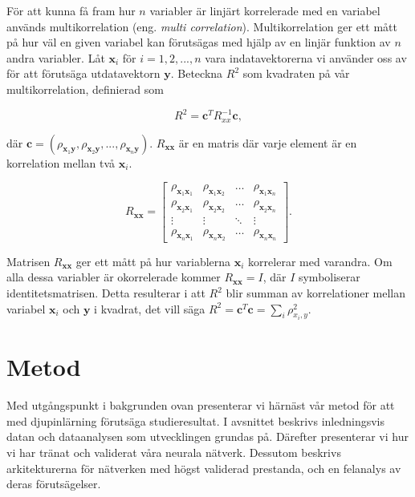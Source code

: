 För att kunna få fram hur $n$ variabler är linjärt korrelerade med en variabel används multikorrelation (eng. \emph{multi correlation}). Multikorrelation ger ett mått på hur väl en given variabel kan förutsägas med hjälp av en linjär funktion av $n$ andra variabler. Låt $\mathbf{x}_{i}$ för $i = 1, 2, ..., n$ vara indatavektorerna vi använder oss av för att förutsäga utdatavektorn $\mathbf{y}$. Beteckna $R^2$ som kvadraten på vår multikorrelation, definierad som \cite{multikorr}

\begin{equation}
    R^{2} = \mathbf{c}^{T}R_{xx}^{-1}\mathbf{c},
    \label{eq:multikorre}
\end{equation}

\noindent
där $\mathbf{c} = (\rho_{\mathbf{x}_1\mathbf{y}}, \rho_{\mathbf{x}_2\mathbf{y}}, ..., \rho_{\mathbf{x}_n\mathbf{y}})$. $R_{\mathbf{xx}}$ är en matris där varje element är en korrelation mellan två $\mathbf{x}_i$. 

 
\begin{equation}
    R_{\mathbf{xx}} = 
    \begin{bmatrix}
    \rho_{\mathbf{x}_1\mathbf{x}_1} & \rho_{\mathbf{x}_1\mathbf{x}_2} &  \dots  & \rho_{\mathbf{x}_1\mathbf{x}_n} \\
    \rho_{\mathbf{x}_2\mathbf{x}_1} & \rho_{\mathbf{x}_2\mathbf{x}_2} & \dots  & \rho_{\mathbf{x}_2\mathbf{x}_n} \\
    \vdots & \vdots  & \ddots & \vdots \\
    \rho_{\mathbf{x}_n\mathbf{x}_1} & \rho_{\mathbf{x}_n\mathbf{x}_2} & \dots  & \rho_{\mathbf{x}_n\mathbf{x}_n}
\end{bmatrix}.    
\end{equation}

\noindent
Matrisen $R_\mathbf{xx}$ ger ett mått på hur variablerna $\mathbf{x}_{i}$ korrelerar med varandra. Om alla dessa variabler är okorrelerade kommer $R_\mathbf{xx} = I$, där $I$ symboliserar identitetsmatrisen. Detta resulterar i att $R^2$ blir summan av korrelationer mellan variabel $\mathbf{x}_{i}$ och $\mathbf{y}$ i kvadrat, det vill säga $R^2 = \mathbf{c}^{T}\mathbf{c} = \sum_i \rho_{x_i,y}^2$.

\section{Metod}
Med utgångspunkt i bakgrunden ovan presenterar vi härnäst vår metod för att med djupinlärning förutsäga studieresultat. I avsnittet beskrivs inledningsvis datan och dataanalysen som utvecklingen grundas på. Därefter presenterar vi hur vi har tränat och validerat våra neurala nätverk. Dessutom beskrivs arkitekturerna för nätverken med högst validerad prestanda, och en felanalys av deras förutsägelser. 

